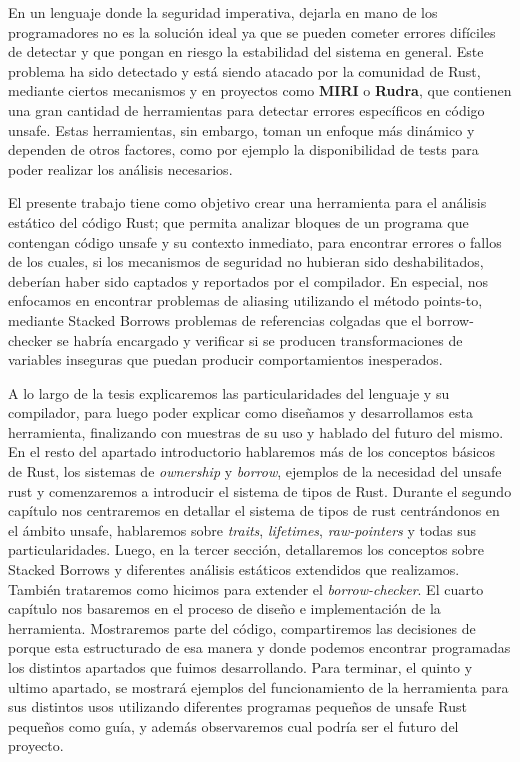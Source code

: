 En un lenguaje donde la seguridad imperativa, dejarla en mano de los programadores no es la solución ideal ya que se pueden cometer errores difíciles de detectar y que pongan en riesgo la estabilidad del sistema en general. Este problema ha sido detectado y está siendo atacado por la comunidad de Rust, mediante ciertos mecanismos y en proyectos como \textbf{MIRI} o \textbf{Rudra}, que contienen una gran cantidad de herramientas para detectar errores específicos en código unsafe. Estas herramientas, sin embargo, toman un enfoque más dinámico y dependen de otros factores, como por ejemplo la disponibilidad de tests para poder realizar los análisis necesarios.

El presente trabajo tiene como objetivo crear una herramienta para el análisis estático del código Rust; que permita analizar bloques de un programa que contengan código unsafe y su contexto inmediato, para encontrar errores o fallos de los cuales, si los mecanismos de seguridad no hubieran sido deshabilitados, deberían haber sido captados y reportados por el compilador. En especial, nos enfocamos en encontrar problemas de aliasing utilizando el método points-to, mediante Stacked Borrows problemas de referencias colgadas que el borrow-checker se habría encargado y verificar si se producen transformaciones de variables inseguras que puedan producir comportamientos inesperados.

A lo largo de la tesis explicaremos las particularidades del lenguaje y su compilador, para luego poder explicar como diseñamos y desarrollamos esta herramienta, finalizando con muestras de su uso y hablado del futuro del mismo.
En el resto del apartado introductorio hablaremos más de los conceptos básicos de Rust, los sistemas de \textit{ownership} y \textit{borrow}, ejemplos de la necesidad del unsafe rust y comenzaremos a introducir el sistema de tipos de Rust.
Durante el segundo capítulo nos centraremos en detallar el sistema de tipos de rust centrándonos en el ámbito unsafe, hablaremos sobre \textit{traits}, \textit{lifetimes}, \textit{raw-pointers} y todas sus particularidades.
Luego, en la tercer sección, detallaremos los conceptos sobre Stacked Borrows \citep{stackedborrows} y diferentes análisis estáticos extendidos que realizamos. También trataremos como hicimos para extender el \textit{borrow-checker}.
El cuarto capítulo nos basaremos en el proceso de diseño e implementación de la herramienta. Mostraremos parte del código, compartiremos las decisiones de porque esta estructurado de esa manera y donde podemos encontrar programadas los distintos apartados que fuimos desarrollando.
Para terminar, el quinto y ultimo apartado, se mostrará ejemplos del funcionamiento de la herramienta para sus distintos usos utilizando diferentes programas pequeños de unsafe Rust pequeños como guía, y además observaremos cual podría ser el futuro del proyecto.


